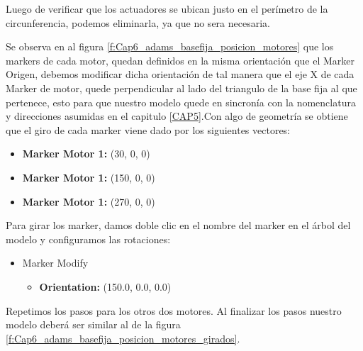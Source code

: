         Luego de verificar que los actuadores se ubican justo en el perímetro de la circunferencia, podemos eliminarla, ya que no sera necesaria.
        
        Se observa en al figura \eqref{f:Cap6_adams_basefija_posicion_motores} que los markers de cada motor, quedan definidos en la misma orientación que el Marker Origen, debemos modificar dicha orientación de tal manera que el eje X de cada Marker de motor, quede perpendicular al lado del triangulo de la base fija al que pertenece, esto para que nuestro modelo quede en sincronía con la nomenclatura y direcciones asumidas en el capitulo \eqref{CAP5}.Con algo de geometría se obtiene que el giro de cada marker viene dado por los siguientes vectores:
        
        \begin{itemize}
            \item \textbf{Marker Motor 1:} (30, 0, 0)
            \item \textbf{Marker Motor 1:} (150, 0, 0)
            \item \textbf{Marker Motor 1:} (270, 0, 0)
        \end{itemize}
        
        Para girar los marker, damos doble clic en el nombre del marker en el árbol del modelo y configuramos las rotaciones:
        
        \begin{scope}
            \renewcommand{\labelitemi}{\blacklozenge}
            \renewcommand{\labelitemii}{\checkmark}
            \begin{itemize}
                \item Marker Modify
                \begin{itemize}
                    \item \textbf{Orientation:} (150.0, 0.0, 0.0)
                \end{itemize}
            \end{itemize}
        \end{scope}
        
        Repetimos los pasos para los otros dos motores. Al finalizar los pasos nuestro modelo deberá ser similar al de la figura \eqref{f:Cap6_adams_basefija_posicion_motores_girados}.
        
